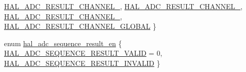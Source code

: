\begin{DoxyCompactItemize}
\hyperlink{group__ADC_gga99371f47be5b6b4b61c32a1ea86f2b6cad33cd49685f140838b575ce39fa26b47}{H\+A\+L\+\_\+\+A\+D\+C\+\_\+\+R\+E\+S\+U\+L\+T\+\_\+\+C\+H\+A\+N\+N\+E\+L\+\_}, 
\hyperlink{group__ADC_gga99371f47be5b6b4b61c32a1ea86f2b6cab81b8df7af28471ac9a6487e88dc0aa8}{H\+A\+L\+\_\+\+A\+D\+C\+\_\+\+R\+E\+S\+U\+L\+T\+\_\+\+C\+H\+A\+N\+N\+E\+L\+\_}, 
\hyperlink{group__ADC_gga99371f47be5b6b4b61c32a1ea86f2b6ca40f8bddc9303b2bae49bb0fcf4dcdf83}{H\+A\+L\+\_\+\+A\+D\+C\+\_\+\+R\+E\+S\+U\+L\+T\+\_\+\+C\+H\+A\+N\+N\+E\+L\+\_}, 
\newline
\hyperlink{group__ADC_gga99371f47be5b6b4b61c32a1ea86f2b6ca5745789eb64375e74e6046b035e92b67}{H\+A\+L\+\_\+\+A\+D\+C\+\_\+\+R\+E\+S\+U\+L\+T\+\_\+\+C\+H\+A\+N\+N\+E\+L\+\_\+\+G\+L\+O\+B\+AL}
 \}
\item 
enum \hyperlink{group__ADC_ga7761986f9c56b809bce1299c6c32eddd}{hal\+\_\+adc\+\_\+sequence\+\_\+result\+\_\+en} \{ \hyperlink{group__ADC_gga7761986f9c56b809bce1299c6c32eddda0c93ff0a1c4ed09ad4b9e1443c4f329f}{H\+A\+L\+\_\+\+A\+D\+C\+\_\+\+S\+E\+Q\+U\+E\+N\+C\+E\+\_\+\+R\+E\+S\+U\+L\+T\+\_\+\+V\+A\+L\+ID} = 0, 
\hyperlink{group__ADC_gga7761986f9c56b809bce1299c6c32edddaec35d0357a3d36bc2c2789d2d45a994e}{H\+A\+L\+\_\+\+A\+D\+C\+\_\+\+S\+E\+Q\+U\+E\+N\+C\+E\+\_\+\+R\+E\+S\+U\+L\+T\+\_\+\+I\+N\+V\+A\+L\+ID}
 \}
\end{DoxyCompactItemize}
